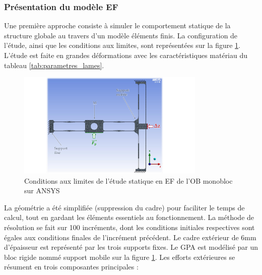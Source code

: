 		\subsubsection{Présentation du modèle EF} 
Une première approche consiste à simuler le comportement statique de la structure globale au travers d'un modèle éléments finis. La configuration de l'étude, ainsi que les conditions aux limites, sont représentées sur la figure \ref{fig:ANSYS_Conditions_Initiales}. L'étude est faite en grandes déformations avec les caractéristiques matériau du tableau \ref{tab:parametres_lames}.\\
\begin{figure}[!htbp]
\begin{center}
    \captionsetup{justification=centering}
	\includegraphics[trim={4.5cm 0cm 6.5cm 0cm},clip, width=0.8\textwidth]{../Chap3/Figure/ANSYS_Conditions_Initiales.pdf}
	\caption{Conditions aux limites de l'étude statique en EF de l'OB monobloc sur ANSYS}
	\label{fig:ANSYS_Conditions_Initiales}
\end{center}
\end{figure}
La géométrie a été simplifiée (suppression du cadre) pour faciliter le temps de calcul, tout en gardant les éléments essentiels au fonctionnement. La méthode de résolution se fait sur 100 incréments, dont les conditions initiales respectives sont égales aux conditions finales de l'incrément précédent. Le cadre extérieur de 6mm d'épaisseur est représenté par les trois supports fixes. Le GPA est modélisé par un bloc rigide nommé support mobile sur la figure \ref{fig:ANSYS_Conditions_Initiales}. Les efforts extérieures se résument en trois composantes principales :
